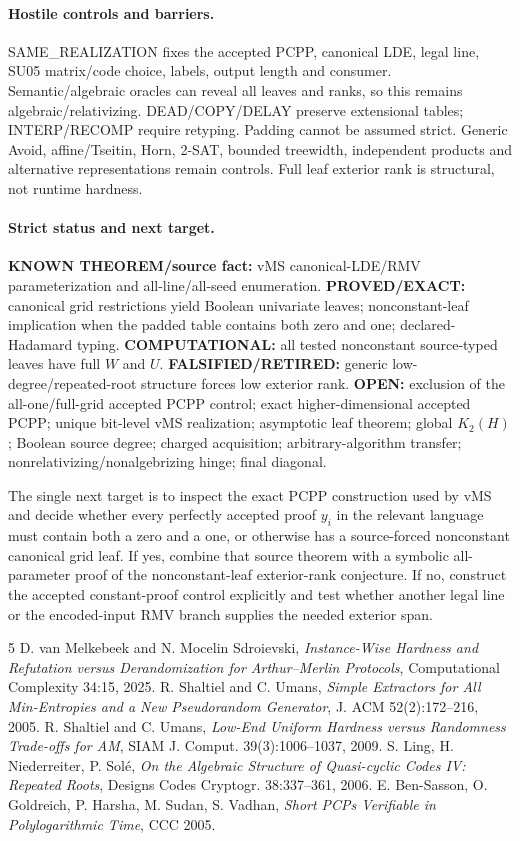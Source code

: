 \documentclass[11pt]{article}
\begin{document}
\paragraph{Hostile controls and barriers.}
SAME_REALIZATION fixes the accepted PCPP, canonical LDE, legal line, SU05 matrix/code choice, labels, output length and consumer. Semantic/algebraic oracles can reveal all leaves and ranks, so this remains algebraic/relativizing. DEAD/COPY/DELAY preserve extensional tables; INTERP/RECOMP require retyping. Padding cannot be assumed strict. Generic Avoid, affine/Tseitin, Horn, 2-SAT, bounded treewidth, independent products and alternative representations remain controls. Full leaf exterior rank is structural, not runtime hardness.

\paragraph{Strict status and next target.}
\textbf{KNOWN THEOREM/source fact:} vMS canonical-LDE/RMV parameterization and all-line/all-seed enumeration.
\textbf{PROVED/EXACT:} canonical grid restrictions yield Boolean univariate leaves; nonconstant-leaf implication when the padded table contains both zero and one; declared-Hadamard typing.
\textbf{COMPUTATIONAL:} all tested nonconstant source-typed leaves have full $W$ and $U$.
\textbf{FALSIFIED/RETIRED:} generic low-degree/repeated-root structure forces low exterior rank.
\textbf{OPEN:} exclusion of the all-one/full-grid accepted PCPP control; exact higher-dimensional accepted PCPP; unique bit-level vMS realization; asymptotic leaf theorem; global $K_2(H)$; Boolean source degree; charged acquisition; arbitrary-algorithm transfer; nonrelativizing/nonalgebrizing hinge; final diagonal.

The single next target is to inspect the exact PCPP construction used by vMS and decide whether every perfectly accepted proof $y_i$ in the relevant language must contain both a zero and a one, or otherwise has a source-forced nonconstant canonical grid leaf. If yes, combine that source theorem with a symbolic all-parameter proof of the nonconstant-leaf exterior-rank conjecture. If no, construct the accepted constant-proof control explicitly and test whether another legal line or the encoded-input RMV branch supplies the needed exterior span.

\begin{thebibliography}{5}
 D. van Melkebeek and N. Mocelin Sdroievski, \emph{Instance-Wise Hardness and Refutation versus Derandomization for Arthur--Merlin Protocols}, Computational Complexity 34:15, 2025.
 R. Shaltiel and C. Umans, \emph{Simple Extractors for All Min-Entropies and a New Pseudorandom Generator}, J. ACM 52(2):172--216, 2005.
 R. Shaltiel and C. Umans, \emph{Low-End Uniform Hardness versus Randomness Trade-offs for AM}, SIAM J. Comput. 39(3):1006--1037, 2009.
 S. Ling, H. Niederreiter, P. Sol\'e, \emph{On the Algebraic Structure of Quasi-cyclic Codes IV: Repeated Roots}, Designs Codes Cryptogr. 38:337--361, 2006.
 E. Ben-Sasson, O. Goldreich, P. Harsha, M. Sudan, S. Vadhan, \emph{Short PCPs Verifiable in Polylogarithmic Time}, CCC 2005.
\end{thebibliography}
\end{document}
